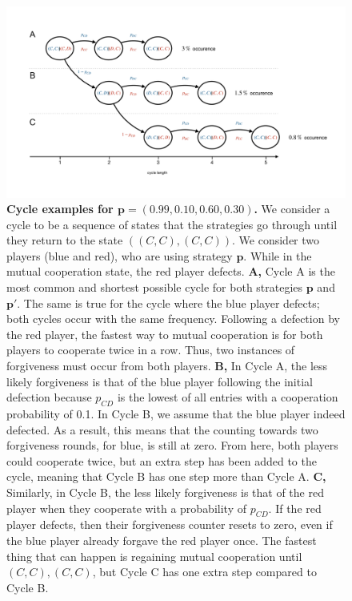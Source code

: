 \documentclass[11pt]{article}
\theoremstyle{plainCl1}
\theoremstyle{plainCl2}
\begin{document}
\begin{figure}
  \centering
\includegraphics[width=\textwidth]{../../figures/player_p_cycles.pdf}
\caption{\textbf{Cycle examples for \(\mathbf{p} = (0.99, 0.10, 0.60, 0.30)\).}
We consider a cycle to be a sequence of states that the strategies go through
until they return to the state \(((C, C), (C, C))\). We consider two players
(blue and red), who are using strategy \(\mathbf{p}\). While in the mutual cooperation
state, the red player defects.
{\bf A,} Cycle A is the most common and shortest
possible cycle for both strategies \(\mathbf{p}\) and \(\mathbf{p'}\). The same
is true for the cycle where the blue player defects; both cycles occur with the
same frequency. Following a defection by the red player, the fastest way to
mutual cooperation is for both players to cooperate twice in a row. Thus, two
instances of forgiveness must occur from both players.
{\bf B,} In Cycle A, the less likely forgiveness is that of the blue player following the
initial defection because \(p_{CD}\) is the lowest of all entries with a
cooperation probability of 0.1. In Cycle B, we assume that the blue player
indeed defected. As a result, this means that the counting towards two
forgiveness rounds, for blue, is still at zero. From here, both players could cooperate
twice, but an extra step has been added to the cycle, meaning that Cycle B has
one step more than Cycle A.
{\bf C,} Similarly, in Cycle B, the less likely forgiveness is that of the red player
when they cooperate with a probability of \(p_{CD}\). If the red player defects,
then their forgiveness counter resets to zero, even if the blue player already
forgave the red player once. The fastest thing that can happen is regaining
mutual cooperation until \((C, C), (C, C)\), but Cycle C has one extra step
compared to Cycle B.}
\end{figure}
\end{document}
